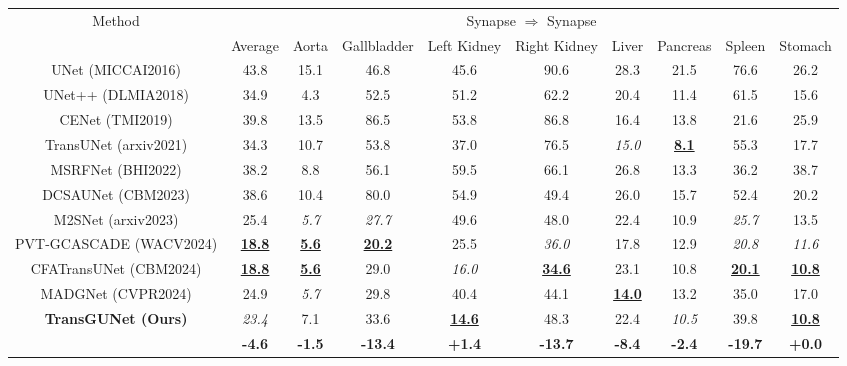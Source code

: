 \begin{table*}
    \centering
    \scriptsize
    \setlength\tabcolsep{9pt} %
    \renewcommand{\arraystretch}{0.6} %
    \begin{tabular}{c|c|cccccccc}
    \hline
    \multicolumn{1}{c|}{\multirow{2}{*}{Method}} & \multicolumn{9}{c}{Synapse $\Rightarrow$ Synapse} \\ \cline{2-10}
     & Average & Aorta & Gallbladder & Left Kidney & Right Kidney & Liver & Pancreas & Spleen & Stomach \\
    \hline
    UNet \tiny{(MICCAI2016)}     & 43.8 & 15.1 & 46.8 & 45.6 & 90.6 & 28.3 & 21.5 & 76.6 & 26.2 \\
    UNet++ \tiny{(DLMIA2018)}    & 34.9 & 4.3 & 52.5 & 51.2 & 62.2 & 20.4 & 11.4 & 61.5 & 15.6 \\
    CENet \tiny{(TMI2019)}       & 39.8 & 13.5 & 86.5 & 53.8 & 86.8 & 16.4 & 13.8 & 21.6 & 25.9 \\
    TransUNet \tiny{(arxiv2021)} & 34.3 & 10.7 & 53.8 & 37.0 & 76.5 & \textit{15.0} & \textbf{\underline{8.1}} & 55.3 & 17.7 \\
    MSRFNet \tiny{(BHI2022)}     & 38.2 & 8.8 & 56.1 & 59.5 & 66.1 & 26.8 & 13.3 & 36.2 & 38.7 \\
    DCSAUNet \tiny{(CBM2023)}    & 38.6 & 10.4 & 80.0 & 54.9 & 49.4 & 26.0 & 15.7 & 52.4 & 20.2 \\
    M2SNet \tiny{(arxiv2023)}    & 25.4 & \textit{5.7} & \textit{27.7} & 49.6 & 48.0 & 22.4 & 10.9 & \textit{25.7} & 13.5 \\
    PVT-GCASCADE \tiny{(WACV2024)} & \textbf{\underline{18.8}} & \textbf{\underline{5.6}} & \textbf{\underline{20.2}} & 25.5 & \textit{36.0} & 17.8 & 12.9 & \textit{20.8} & \textit{11.6} \\
    CFATransUNet \tiny{(CBM2024)} & \textbf{\underline{18.8}} & \textbf{\underline{5.6}} & 29.0 & \textit{16.0} & \textbf{\underline{34.6}} & 23.1 & 10.8 & \textbf{\underline{20.1}} & \textbf{\underline{10.8}} \\
    MADGNet \tiny{(CVPR2024)}    & 24.9 & \textit{5.7} & 29.8 & 40.4 & 44.1 & \textbf{\underline{14.0}} & 13.2 & 35.0 & 17.0 \\
    \hline
    \multicolumn{1}{c|}{\multirow{2}{*}{\textbf{TransGUNet \tiny{(Ours)}}}} & \textit{23.4} & 7.1 & 33.6 & \textbf{\underline{14.6}} & 48.3 & 22.4 & \textit{10.5} & 39.8 & \textbf{\underline{10.8}} \\ \cline{2-10}
    & \textbf{-4.6} & \textbf{-1.5} & \textbf{-13.4} & \textbf{+1.4} & \textbf{-13.7} & \textbf{-8.4} & \textbf{-2.4} & \textbf{-19.7} & \textbf{+0.0} \\

\end{tabular}
\end{table*}
